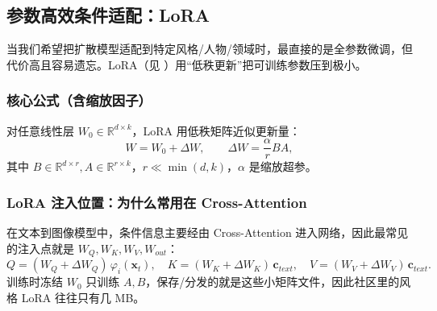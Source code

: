 \documentclass[zihao=-4, fontset=windows]{ctexart}
\begin{document}
\subsection{参数高效条件适配：LoRA}

当我们希望把扩散模型适配到特定风格/人物/领域时，最直接的是全参数微调，但代价高且容易遗忘。LoRA（见 \cite{hu2021lora}）用“低秩更新”把可训练参数压到极小。

\subsubsection{核心公式（含缩放因子）}
对任意线性层 $W_0\in\mathbb{R}^{d\times k}$，LoRA 用低秩矩阵近似更新量：
\begin{equation}
    W = W_0 + \Delta W,\qquad \Delta W = \frac{\alpha}{r}BA,
\end{equation}
其中 $B\in\mathbb{R}^{d\times r},A\in\mathbb{R}^{r\times k}$，$r\ll\min(d,k)$，$\alpha$ 是缩放超参。

\subsubsection{LoRA 注入位置：为什么常用在 Cross-Attention}
在文本到图像模型中，条件信息主要经由 Cross-Attention 进入网络，因此最常见的注入点就是 $W_Q,W_K,W_V,W_{out}$：
\begin{equation}
    Q=(W_Q+\Delta W_Q)\,\varphi_i(\mathbf{x}_t),\quad
    K=(W_K+\Delta W_K)\,\mathbf{c}_{text},\quad
    V=(W_V+\Delta W_V)\,\mathbf{c}_{text}.
\end{equation}
训练时冻结 $W_0$ 只训练 $A,B$，保存/分发的就是这些小矩阵文件，因此社区里的风格 LoRA 往往只有几 MB。
\nocite{*}

\end{document}
